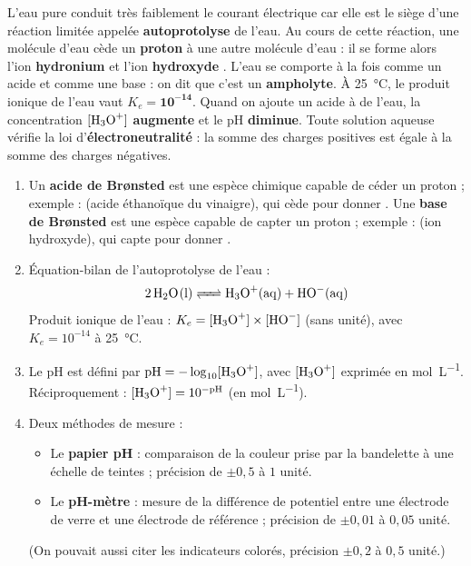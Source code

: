 \documentclass[11pt]{article}
\begin{document}
\begin{corrige}
L'eau pure conduit très faiblement le courant électrique car elle est le siège d'une réaction limitée appelée \textbf{autoprotolyse} de l'eau. Au cours de cette réaction, une molécule d'eau cède un \textbf{proton} à une autre molécule d'eau : il se forme alors l'ion \textbf{hydronium}  et l'ion \textbf{hydroxyde} . L'eau se comporte à la fois comme un acide et comme une base : on dit que c'est un \textbf{ampholyte}. À \SI{25}{\celsius}, le produit ionique de l'eau vaut $K_e = \mathbf{10^{-14}}$. Quand on ajoute un acide à de l'eau, la concentration $[\ce{H3O+}]$ \textbf{augmente} et le pH \textbf{diminue}. Toute solution aqueuse vérifie la loi d'\textbf{électroneutralité} : la somme des charges positives est égale à la somme des charges négatives.
\end{corrige}

\begin{corrige}
\begin{enumerate}
\item Un \textbf{acide de Brønsted} est une espèce chimique capable de céder un proton  ; exemple :  (acide éthanoïque du vinaigre), qui cède  pour donner . Une \textbf{base de Brønsted} est une espèce capable de capter un proton  ; exemple :  (ion hydroxyde), qui capte  pour donner .
\item Équation-bilan de l'autoprotolyse de l'eau :
\[ \ce{2 H2O(l) <=> H3O+(aq) + HO-(aq)} \]
Produit ionique de l'eau : $K_e = [\ce{H3O+}] \times [\ce{HO-}]$ (sans unité), avec $K_e = 10^{-14}$ à \SI{25}{\celsius}.
\item Le pH est défini par $\mathrm{pH} = -\log_{10}[\ce{H3O+}]$, avec $[\ce{H3O+}]$ exprimée en \si{mol.L^{-1}}. Réciproquement : $[\ce{H3O+}] = 10^{-\mathrm{pH}}$ (en \si{mol.L^{-1}}).
\item Deux méthodes de mesure :
\begin{itemize}
\item Le \textbf{papier pH} : comparaison de la couleur prise par la bandelette à une échelle de teintes ; précision de $\pm 0{,}5$ à $1$ unité.
\item Le \textbf{pH-mètre} : mesure de la différence de potentiel entre une électrode de verre et une électrode de référence ; précision de $\pm 0{,}01$ à $0{,}05$ unité.
\end{itemize}
(On pouvait aussi citer les indicateurs colorés, précision $\pm 0{,}2$ à $0{,}5$ unité.)
\end{enumerate}
\end{corrige}
\end{document}
